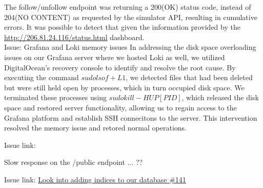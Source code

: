 The follow/unfollow endpoint was returning a 200(OK) status code, instead of 204(NO CONTENT) as requested by the simulator API, resulting in cumulative errors. It was possible to detect that given the information provided by the \href{http://206.81.24.116/status.html}{\color{blue}http://206.81.24.116/status.html} dashboard. 
\\
Issue: Grafana and Loki memory issues
In addressing the disk space overloading issues on our Grafana server where we hosted Loki as well, we utilized DigitalOcean's recovery console to identify and resolve the root cause. By executing the command $sudo lsof +L1$, we detected files that had been deleted but were still held open by processes, which in turn occupied disk space. We terminated these processes using $sudo kill -HUP [PID]$, which released the disk space and restored server functionality, allowing us to regain access to the Grafana platform and establish SSH connecitons to the server. This intervention resolved the memory issue and retored normal operations.

Issue link:


Slow response on the /public endpoint ... ??

Issue link: \href{https://github.com/DevopsGroupC/Minitwit/issues/141}{\color{blue}Look into adding indices to our database \#141}





